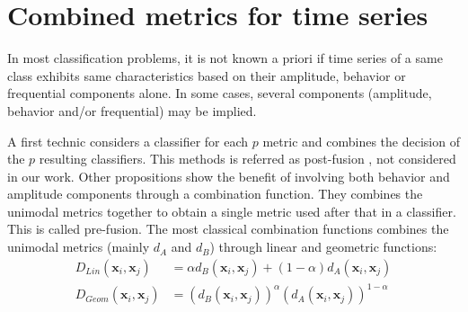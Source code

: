 \section{Combined metrics for time series}

In most classification problems, it is not known a priori if time series of a same class exhibits same characteristics based on their amplitude,  behavior or frequential components alone. In some cases, several components (amplitude, behavior and/or frequential) may be implied. 

A first technic considers a classifier for each $p$ metric and combines the decision of the $p$ resulting classifiers. This methods is referred as post-fusion , not considered in our work. Other propositions show the benefit of involving both behavior and amplitude components through a combination function. They combines the unimodal metrics together to obtain a single metric used after that in a classifier. This is called pre-fusion. The most classical combination functions combines the unimodal metrics (mainly $d_A$ and $d_B$) through linear and geometric functions:
\begin{align}
D_{Lin}(\textbf{x}_i,\textbf{x}_j) &= \alpha d_{B}(\textbf{x}_i,\textbf{x}_j) + (1-\alpha) d_A(\textbf{x}_i,\textbf{x}_j)  \label{eq:DLin}   \\
D_{Geom}(\textbf{x}_i,\textbf{x}_j) &= (d_{B}(\textbf{x}_i,\textbf{x}_j))^\alpha  (d_A(\textbf{x}_i,\textbf{x}_j))^{1-\alpha} \label{eq:DGeom}
\end{align}


